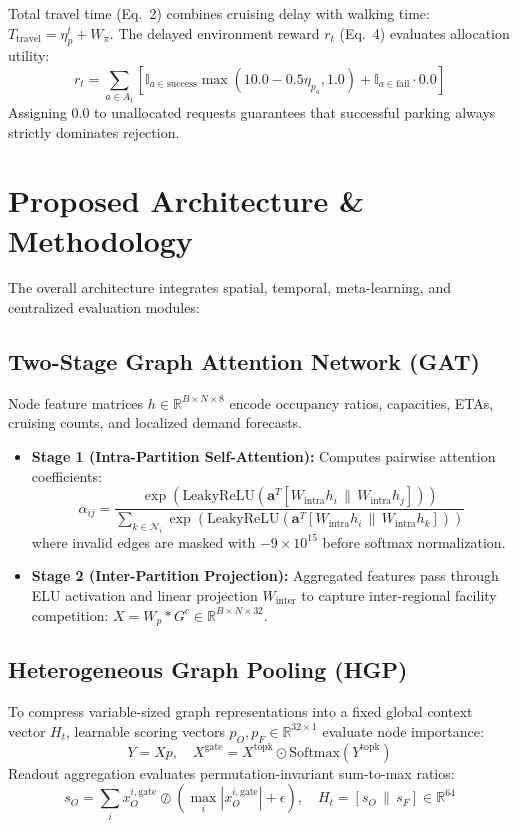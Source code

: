 \documentclass[journal]{IEEEtran}
\begin{document}
Total travel time (Eq.~2) combines cruising delay with walking time: $T_{\text{travel}} = \eta_p^t + W_{\pi}$. The delayed environment reward $r_t$ (Eq.~4) evaluates allocation utility:
\begin{equation}
r_t = \sum_{a \in A_t} \left[ \mathbb{I}_{a \in \text{success}} \max(10.0 - 0.5 \eta_{p_a}, 1.0) + \mathbb{I}_{a \in \text{fail}} \cdot 0.0 \right]
\end{equation}
Assigning $0.0$ to unallocated requests guarantees that successful parking always strictly dominates rejection.

\section{Proposed Architecture \& Methodology}

The overall architecture integrates spatial, temporal, meta-learning, and centralized evaluation modules:

\subsection{Two-Stage Graph Attention Network (GAT)}
Node feature matrices $h \in \mathbb{R}^{B \times N \times 8}$ encode occupancy ratios, capacities, ETAs, cruising counts, and localized demand forecasts.
\begin{itemize}
    \item \textbf{Stage 1 (Intra-Partition Self-Attention):} Computes pairwise attention coefficients:
    \begin{equation}
    \alpha_{ij} = \frac{\exp\left(\text{LeakyReLU}\left(\mathbf{a}^T [W_{\text{intra}} h_i \,\|\, W_{\text{intra}} h_j]\right)\right)}{\sum_{k \in \mathcal{N}_i} \exp\left(\text{LeakyReLU}\left(\mathbf{a}^T [W_{\text{intra}} h_i \,\|\, W_{\text{intra}} h_k]\right)\right)}
    \end{equation}
    where invalid edges are masked with $-9 \times 10^{15}$ before softmax normalization.
    \item \textbf{Stage 2 (Inter-Partition Projection):} Aggregated features pass through ELU activation and linear projection $W_{\text{inter}}$ to capture inter-regional facility competition: $X = W_p * G^c \in \mathbb{R}^{B \times N \times 32}$.
\end{itemize}

\subsection{Heterogeneous Graph Pooling (HGP)}
To compress variable-sized graph representations into a fixed global context vector $H_t$, learnable scoring vectors $p_O, p_F \in \mathbb{R}^{32 \times 1}$ evaluate node importance:
\begin{equation}
Y = X p, \quad X^{\text{gate}} = X^{\text{topk}} \odot \text{Softmax}(Y^{\text{topk}})
\end{equation}
Readout aggregation evaluates permutation-invariant sum-to-max ratios:
\begin{equation}
s_O = \sum_{i} x_O^{i, \text{gate}} \oslash \left(\max_{i} |x_O^{i, \text{gate}}| + \epsilon\right), \quad H_t = [s_O \,\|\, s_F] \in \mathbb{R}^{64}
\end{equation}
\end{document}
